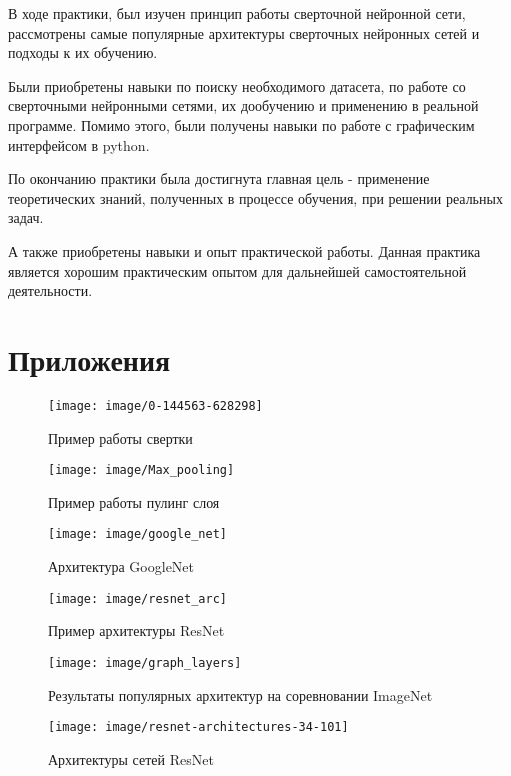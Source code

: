 \documentclass[a4paper,14pt]{article}
\begin{document}
В ходе практики, был изучен принцип работы сверточной нейронной сети,  рассмотрены самые популярные архитектуры сверточных нейронных сетей и подходы к их обучению.

Были приобретены навыки по поиску необходимого датасета, по работе со сверточными нейронными сетями, их дообучению и применению в реальной программе.
Помимо этого, были получены навыки по работе с графическим интерфейсом в python.

По окончанию практики была достигнута главная цель - применение теоретических знаний, полученных в процессе обучения, при решении реальных задач.

А также приобретены навыки и опыт практической работы.
Данная практика является хорошим практическим опытом для дальнейшей самостоятельной деятельности.

\pagebreak
\section{Приложения	}

\begin{figure}[H]
	\centering
	\texttt{[image: image/0-144563-628298]}
	\caption{Пример работы свертки}
	\label{fig:0-144563-628298}
\end{figure}

\begin{figure}[H]
	\centering
	\texttt{[image: image/Max\_pooling]}
	\caption{Пример работы пулинг слоя}
	\label{fig:maxpooling}
\end{figure}

\begin{figure}[H]
	\centering
	\texttt{[image: image/google\_net]}
	\caption{Архитектура GoogleNet}
	\label{fig:googlenet}
\end{figure}


\begin{figure}[H]
	\centering
	\texttt{[image: image/resnet\_arc]}
	\caption{Пример архитектуры ResNet}
	\label{fig:resnetarc}
\end{figure}


\begin{figure}[H]
	\centering
	\texttt{[image: image/graph\_layers]}
	\caption{Результаты популярных архитектур на соревновании ImageNet}
	\label{fig:graphlayers}
\end{figure}

\begin{figure}[H]
	\centering
	\texttt{[image: image/resnet-architectures-34-101]}
	\caption{Архитектуры сетей ResNet}
	\label{fig:resnet-architectures-34-101}
\end{figure}
\end{document}
